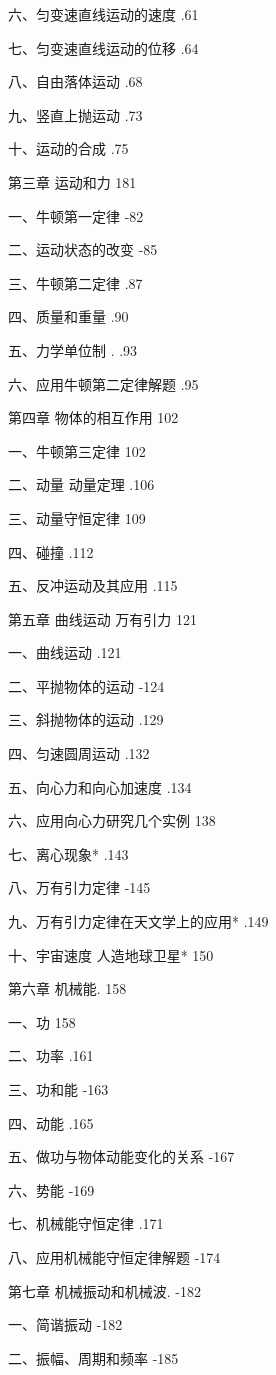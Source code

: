 \documentclass[10pt]{article}
\begin{document}
六、匀变速直线运动的速度 .61

七、匀变速直线运动的位移 .64

八、自由落体运动 .68

九、竖直上抛运动 .73

十、运动的合成 .75

第三章 运动和力 181

一、牛顿第一定律 -82

二、运动状态的改变 -85

三、牛顿第二定律 .87

四、质量和重量 .90

五、力学单位制 . .93

六、应用牛顿第二定律解题 .95

第四章 物体的相互作用 102

一、牛顿第三定律 102

二、动量 动量定理 .106

三、动量守恒定律 109

四、碰撞 .112

五、反冲运动及其应用 .115

第五章 曲线运动 万有引力 121

一、曲线运动 .121

二、平抛物体的运动 -124

三、斜抛物体的运动 .129

四、匀速圆周运动 .132

五、向心力和向心加速度 .134

六、应用向心力研究几个实例 138

七、离心现象* .143

八、万有引力定律 -145

九、万有引力定律在天文学上的应用* .149

十、宇宙速度 人造地球卫星* 150

第六章 机械能. 158

一、功 158

二、功率 .161

三、功和能 -163

四、动能 .165

五、做功与物体动能变化的关系 -167

六、势能 -169

七、机械能守恒定律 .171

八、应用机械能守恒定律解题 -174

第七章 机械振动和机械波. -182

一、简谐振动 -182

二、振幅、周期和频率 -185
\end{document}
